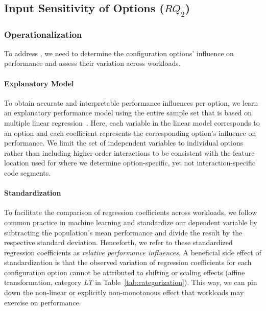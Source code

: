 {{\subsection{Input Sensitivity of Options ($RQ_2$)}\label{sec:rq2}

\subsubsection{Operationalization}
To address , we need to determine the configuration options’ influence on performance and assess their variation across workloads. 

\paragraph*{Explanatory Model}
To obtain accurate and interpretable performance influences per option, we learn an explanatory performance model using the entire sample set that is based on multiple linear regression~\cite{dorn2020,siegmundPerformanceinfluenceModelsHighly2015,perLasso}. Here, each variable in the linear model corresponds to an option and each coefficient represents the corresponding option's influence on performance. 
We limit the set of independent variables to individual options rather than including higher-order interactions to be consistent with the feature location used for  where we determine option-specific, yet not interaction-specific code segments.
\paragraph*{Standardization}
To facilitate the comparison of regression coefficients across workloads, we follow common practice in machine learning and standardize our dependent variable by subtracting the population’s mean performance and divide the result by the respective standard deviation. Henceforth, we refer to these standardized regression coefficients as \textit{relative performance influences}. A beneficial side effect of standardization is that the observed variation of regression coefficients for each configuration option cannot be attributed to shifting or scaling effects (affine transformation, category \colorbox{lt-color}{\textit{LT}} in Table~\ref{tab:categorization}). This way, we can pin down  the non-linear or explicitly non-monotonous effect that workloads may exercise on performance.
}}
